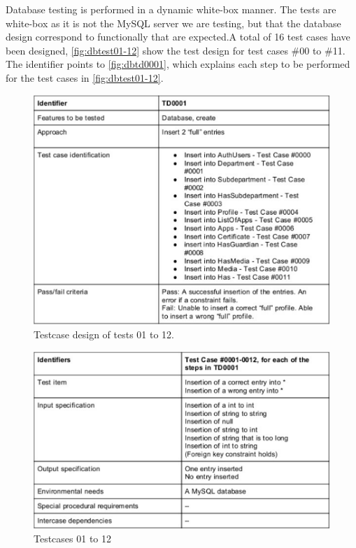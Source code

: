 Database testing is performed in a dynamic white-box manner. The tests are white-box as it is not the MySQL server we are testing, but that the database design
correspond to functionally that are expected.A total of 16 test cases have been designed, \autoref{fig:dbtest01-12} show the test design for test cases \#00 to \#11.
The identifier  points to \autoref{fig:dbtd0001}, which explains each step to be performed for the test cases in \autoref{fig:dbtest01-12}.


\begin{figure}[H]
 \includegraphics[scale=1.00]{images/dbtesttd0001}
 \caption{Testcase design of tests 01 to 12.}
  \label{fig:dbtest01-12}
\end{figure}

\begin{figure}[H]
 \includegraphics[scale=1.00]{images/dbtestcase01-12}
  \caption{Testcases 01 to 12}
  \label{fig:dbtd0001}
\end{figure}

